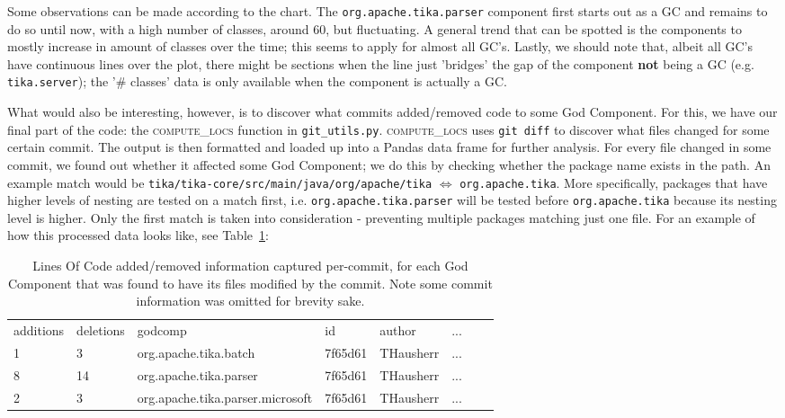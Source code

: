 \documentclass{article}
\begin{document}
Some observations can be made according to the chart. The \texttt{org.apache.tika.parser} component first starts out as a GC and remains to do so until now, with a high number of classes, around 60, but fluctuating. A general trend that can be spotted is the components to mostly increase in amount of classes over the time; this seems to apply for almost all GC's. Lastly, we should note that, albeit all GC's have continuous lines over the plot, there might be sections when the line just 'bridges' the gap of the component \textbf{not} being a GC (e.g. \texttt{tika.server}); the '\# classes' data is only available when the component is actually a GC. 

What would also be interesting, however, is to discover what commits added/removed code to some God Component. For this, we have our final part of the code: the \textsc{compute\_locs} function in \texttt{git\_utils.py}. \textsc{compute\_locs} uses \texttt{git diff} to discover what files changed for some certain commit. The output is then formatted and loaded up into a Pandas data frame for further analysis. For every file changed in some commit, we found out whether it affected some God Component; we do this by checking whether the package name exists in the path. An example match would be \texttt{tika/tika-core/src/main/java/org/apache/tika} $\Leftrightarrow$ \texttt{org.apache.tika}. More specifically, packages that have higher levels of nesting are tested on a match first, i.e. \texttt{org.apache.tika.parser} will be tested before \texttt{org.apache.tika} because its nesting level is higher. Only the first match is taken into consideration - preventing multiple packages matching just one file. For an example of how this processed data looks like, see Table~\ref{tab:locs}:

\begin{table}[ht]
\begin{tabular}{llllllll}
additions & deletions & godcomp                          & id                                       & author    & ...\\
1         & 3         & org.apache.tika.batch            & 7f65d61 & THausherr & ... \\
8         & 14        & org.apache.tika.parser           & 7f65d61 & THausherr & ... \\
2         & 3         & org.apache.tika.parser.microsoft & 7f65d61 & THausherr & ... \\
\end{tabular}
\caption{Lines Of Code added/removed information captured per-commit, for each God Component that was found to have its files modified by the commit. Note some commit information was omitted for brevity sake.}
\label{tab:locs}
\end{table}
\end{document}

